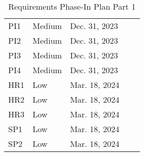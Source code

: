 \documentclass[12pt]{article}
\begin{document}
\begin{table}[H]
\begin{tabular}{|l|l|l|ll}
PI1         & Medium     & Dec. 31, 2023      &  &  \\ \cline{1-3}
PI2         & Medium     & Dec. 31, 2023     &  &  \\ \cline{1-3}
PI3         & Medium     & Dec. 31, 2023     &  &  \\ \cline{1-3}
PI4         & Medium   & Dec. 31, 2023      &  &  \\ \cline{1-3}
HR1         & Low   & Mar. 18, 2024      &  &  \\ \cline{1-3}
HR2         & Low   & Mar. 18, 2024      &  &  \\ \cline{1-3}
HR3         & Low   & Mar. 18, 2024      &  &  \\ \cline{1-3}
SP1         & Low   & Mar. 18, 2024      &  &  \\ \cline{1-3}
SP2         & Low   & Mar. 18, 2024      &  &  \\ \cline{1-3}
\end{tabular}
\caption{Requirements Phase-In Plan Part 1}
\end{table}
\end{document}
